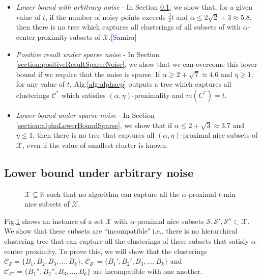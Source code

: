 \documentclass[anon,12pt]{colt2016} %
\newcommand{\mc}{\mathcal}
\newcommand{\samira}{\textcolor{blue}{[Samira]}\xspace}
\begin{document}
\begin{itemize}
\item {\it Lower bound with arbitrary noise} - In Section \ref{section:alphaLowerBoundArbitrary}, we show that, for a given value of $t$, if the number of noisy points exceeds $\frac{3}{2}t$ and $\alpha \le 2\sqrt{2} + 3 \approx 5.8$, then there is no tree which captures all clusterings of all subsets of with $\alpha$-center proximity subsets of $\mc X$.\samira
\item  {\it Positive result under sparse noise} - In Section \ref{section:positiveResultSparseNoise}, we show that we can overcome this lower bound if we require that the noise is sparse. If $\alpha \ge 2 + \sqrt{7} \approx 4.6$ and $\eta \ge 1$; for any value of $t$, Alg.\ref{alg:alphacp} outputs a tree which captures all clusterings $\mc C^*$ which satisfies $(\alpha, \eta)$-proximality and $m(C^*)=t$.
\item  {\it Lower bound under sparse noise} - In Section \ref{section:alphaLowerBoundSparse}, we show that if $\alpha \le 2 + \sqrt{3} \approx 3.7$ and $\eta \le 1$, then there is no tree that captures all $(\alpha, \eta)$-proximal nice subsets of $\mc X$, even if the value of smallest cluster is known.
\end{itemize} 


\subsection{Lower bound under arbitrary noise}
\label{section:alphaLowerBoundArbitrary}

\begin{figure}

\caption{$\mc X \subseteq \mathbb{R}$ such that no algorithm can capture all the $\alpha$-proximal $t$-min nice subsets of $\mc X$. } 
\label{fig:nosparsealg}
\end{figure}

Fig.\ref{fig:nosparsealg} shows an instance of a set $\mc X$ with $\alpha$-proximal nice subsets $\mc S, \mc S', \mc S'' \subset \mc X$. We show that these subsets are ``incompatible" i.e., there is no  hierarchical clustering tree that can capture all the clusterings of these subsets that satisfy $\alpha$-center proximity. To prove this, we will show that the clusterings $\mc C_{\mc S} = \{B_1, B_2, B_3, \ldots, B_k\}$, $\mc C_{\mc S'} = \{B_1', B_2', B_3, \ldots, B_k\}$ and $\mc C_{\mc S''} = \{B_1'', B_2'', B_3, \ldots, B_k\}$ are incompatible with one another.
\end{document}
